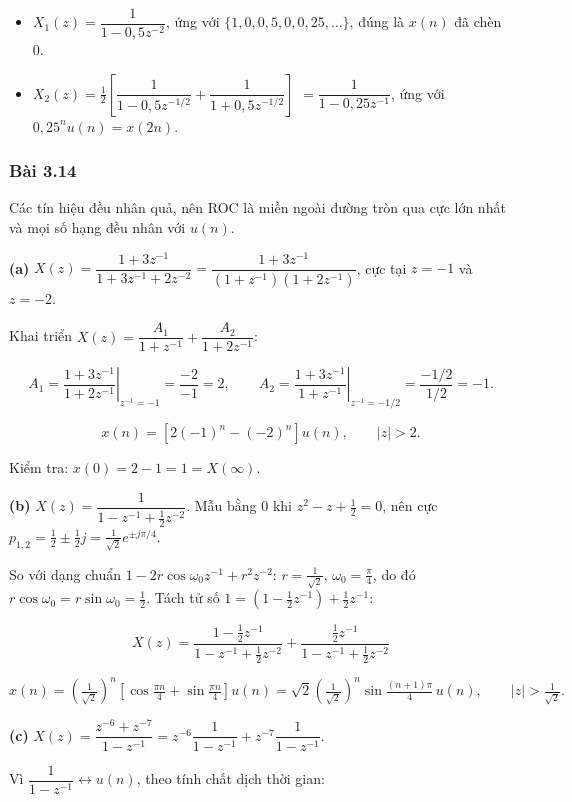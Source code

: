 \documentclass[12pt,a4paper]{article}
\begin{document}
\begin{itemize}
\item
  \(X_1(z)=\dfrac{1}{1-0{,}5z^{-2}}\), ứng với
  \(\{1,0,0{,}5,0,0{,}25,\dots\}\), đúng là \(x(n)\) đã chèn 0.
\item
  \(X_2(z)=\tfrac12\left[\dfrac{1}{1-0{,}5z^{-1/2}}+\dfrac{1}{1+0{,}5z^{-1/2}}\right]\) \(=\dfrac{1}{1-0{,}25z^{-1}}\),
  ứng với \(0{,}25^n u(n)=x(2n)\).
\end{itemize}

\subsubsection*{Bài 3.14}
Các tín hiệu đều nhân quả, nên ROC là miền ngoài đường tròn qua cực lớn
nhất và mọi số hạng đều nhân với \(u(n)\).

\textbf{(a)}
\(X(z)=\dfrac{1+3z^{-1}}{1+3z^{-1}+2z^{-2}}=\dfrac{1+3z^{-1}}{(1+z^{-1})(1+2z^{-1})}\),
cực tại \(z=-1\) và \(z=-2\).

Khai triển \(X(z)=\dfrac{A_1}{1+z^{-1}}+\dfrac{A_2}{1+2z^{-1}}\):

\[A_1=\left.\frac{1+3z^{-1}}{1+2z^{-1}}\right|_{z^{-1}=-1}=\frac{-2}{-1}=2,\qquad A_2=\left.\frac{1+3z^{-1}}{1+z^{-1}}\right|_{z^{-1}=-1/2}=\frac{-1/2}{1/2}=-1.\]

\[x(n)=\left[2(-1)^n-(-2)^n\right]u(n),\qquad |z|>2.\]

Kiểm tra: \(x(0)=2-1=1=X(\infty)\).

\textbf{(b)} \(X(z)=\dfrac{1}{1-z^{-1}+\frac12z^{-2}}\). Mẫu bằng 0 khi
\(z^2-z+\tfrac12=0\), nên cực
\(p_{1,2}=\tfrac12\pm\tfrac12j=\tfrac{1}{\sqrt2}e^{\pm j\pi/4}\).

So với dạng chuẩn \(1-2r\cos\omega_0 z^{-1}+r^2z^{-2}\):
\(r=\tfrac{1}{\sqrt2}\), \(\omega_0=\tfrac{\pi}{4}\), do đó
\(r\cos\omega_0=r\sin\omega_0=\tfrac12\). Tách tử số
\(1=\left(1-\tfrac12z^{-1}\right)+\tfrac12z^{-1}\):

\[X(z)=\frac{1-\frac12z^{-1}}{1-z^{-1}+\frac12z^{-2}}+\frac{\frac12z^{-1}}{1-z^{-1}+\frac12z^{-2}}\]

\[x(n)=\left(\tfrac{1}{\sqrt2}\right)^n\left[\cos\tfrac{\pi n}{4}+\sin\tfrac{\pi n}{4}\right]u(n)=\sqrt2\left(\tfrac{1}{\sqrt2}\right)^n\sin\tfrac{(n+1)\pi}{4}\,u(n),\qquad |z|>\tfrac{1}{\sqrt2}.\]

\textbf{(c)}
\(X(z)=\dfrac{z^{-6}+z^{-7}}{1-z^{-1}}=z^{-6}\dfrac{1}{1-z^{-1}}+z^{-7}\dfrac{1}{1-z^{-1}}\).

Vì \(\dfrac{1}{1-z^{-1}}\leftrightarrow u(n)\), theo tính chất dịch thời
gian:
\end{document}
